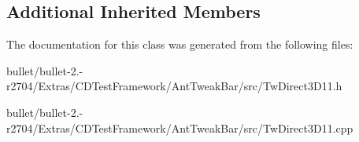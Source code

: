 \subsection*{Additional Inherited Members}


The documentation for this class was generated from the following files\+:\begin{DoxyCompactItemize}
\item 
bullet/bullet-\/2.-\/r2704/\+Extras/\+C\+D\+Test\+Framework/\+Ant\+Tweak\+Bar/src/Tw\+Direct3\+D11.\+h\item 
bullet/bullet-\/2.-\/r2704/\+Extras/\+C\+D\+Test\+Framework/\+Ant\+Tweak\+Bar/src/Tw\+Direct3\+D11.\+cpp\end{DoxyCompactItemize}

